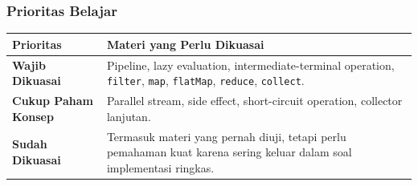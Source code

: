 \subsubsection{Prioritas Belajar}

\begin{tabularx}{\textwidth}{|L{0.22\textwidth}|X|}
\hline
\textbf{Prioritas} & \textbf{Materi yang Perlu Dikuasai} \\
\hline
\textbf{Wajib Dikuasai} & Pipeline, lazy evaluation, intermediate-terminal operation, \texttt{filter}, \texttt{map}, \texttt{flatMap}, \texttt{reduce}, \texttt{collect}. \\
\hline
\textbf{Cukup Paham Konsep} & Parallel stream, side effect, short-circuit operation, collector lanjutan. \\
\hline
\textbf{Sudah Dikuasai} & Termasuk materi yang pernah diuji, tetapi perlu pemahaman kuat karena sering keluar dalam soal implementasi ringkas. \\
\hline
\end{tabularx}
